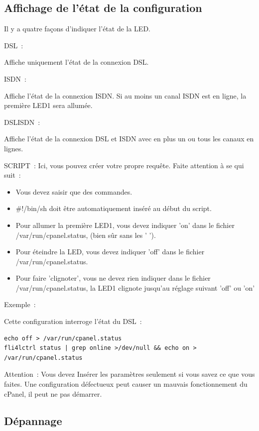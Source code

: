 \subsection{Affichage de l'état de la configuration}

Il y a quatre façons d'indiquer l'état de la LED.

DSL~: 

Affiche uniquement l'état de la connexion DSL.

ISDN~: 

Affiche l'état de la connexion ISDN. Si au moins un canal ISDN est en ligne,
la première LED1 sera allumée.

DSLISDN~:

Affiche l'état de la connexion DSL et ISDN avec en plus un ou tous les canaux
en lignes.

SCRIPT~:
Ici, vous pouvez créer votre propre requête. Faite attention à se qui suit~:
\begin{itemize}
    \item Vous devez saisir que des commandes.
    \item \#!/bin/sh doit être automatiquement inséré au début du script.
    \item Pour allumer la première LED1, vous devez indiquer 'on' dans le fichier
          /var/run/cpanel.status, (bien sûr sans les ' ').
    \item Pour éteindre la LED, vous devez indiquer 'off' dans le fichier
          /var/run/cpanel.status.
    \item Pour faire 'clignoter', vous ne devez rien indiquer dans le
          fichier /var/run/cpanel.status, la LED1 clignote jusqu'au réglage
          suivant 'off' ou 'on'
\end{itemize}

Exemple~:

Cette configuration interroge l'état du DSL~:
\begin{verbatim}
echo off > /var/run/cpanel.status
fli4lctrl status | grep online >/dev/null && echo on > /var/run/cpanel.status
\end{verbatim}
Attention~: 
Vous devez Insérer les paramètres seulement si vous savez ce que vous faites.
Une configuration défectueux peut causer un mauvais fonctionnement du cPanel, il
peut ne pas démarrer.

\subsection{Dépannage}
